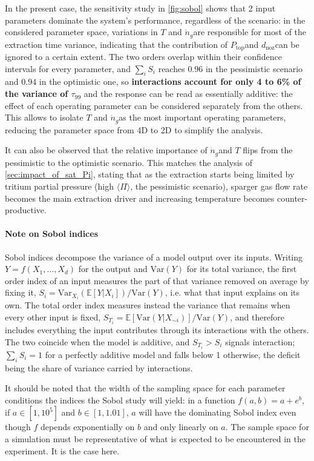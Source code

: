 \documentclass[a4paper,11pt,oneside]{report}
\newcommand{\PI}{\ensuremath{\langle \Pi \rangle}}
\newcommand{\ndotg}{\ensuremath{\dot n_g}}
\newcommand{\dnoz}{\ensuremath{d_\mathrm{noz}}}
\newcommand{\Ptop}{\ensuremath{P_\mathrm{top}}}
\begin{document}
In the present case, the sensitivity study in \cref{fig:sobol} shows that 2 input parameters dominate the system's performance, regardless of the scenario: in the considered parameter space, variations in $T$ and \ndotg are responsible for most of the extraction time variance, indicating that the contribution of \Ptop and \dnoz can be ignored to a certain extent. The two orders overlap within their confidence intervals for every parameter, and $\sum_i S_i$ reaches $0.96$ in the pessimistic scenario and $0.94$ in the optimistic one, so \textbf{interactions account for only 4 to 6\% of the variance of $\tau_{99}$} and the response can be read as essentially additive: the effect of each operating parameter can be considered separately from the others. This allows to isolate $T$ and \ndotg as the most important operating parameters, reducing the parameter space from 4D to 2D to simplify the analysis.

It can also be observed that the relative importance of \ndotg and $T$ flips from the pessimistic to the optimistic scenario. This matches the analysis of \cref{sec:impact_of_sat_Pi}, stating that as the extraction starts being limited by tritium partial pressure (high \PI, the pessimistic scenario), sparger gas flow rate becomes the main extraction driver and increasing temperature becomes counter-productive.  

\paragraph{Note on Sobol indices}

Sobol indices decompose the variance of a model output over its inputs. Writing $Y=f(X_1,\dots,X_d)$ for the output and $\mathrm{Var}(Y)$ for its total variance, the first order index of an input measures the part of that variance removed on average by fixing it, $S_i=\mathrm{Var}_{X_i}\!\left(\mathbb{E}[Y|X_i]\right)/\mathrm{Var}(Y)$, i.e. what that input explains on its own. The total order index measures instead the variance that remains when every other input is fixed, $S_{T_i}=\mathbb{E}\!\left[\mathrm{Var}(Y|X_{\sim i})\right]/\mathrm{Var}(Y)$, and therefore includes everything the input contributes through its interactions with the others. The two coincide when the model is additive, and $S_{T_i}>S_i$ signals interaction; $\sum_i S_i=1$ for a perfectly additive model and falls below 1 otherwise, the deficit being the share of variance carried by interactions.

It should be noted that the width of the sampling space for each parameter conditions the indices the Sobol study will yield: in a function $f(a,b)=a+e^b$, if $a\in[1,10^5]$ and $b\in[1,1.01]$, $a$ will have the dominating Sobol index even though $f$ depends exponentially on $b$ and only linearly on $a$. The sample space for a simulation must be representative of what is expected to be encountered in the experiment. It is the case here.
\end{document}
